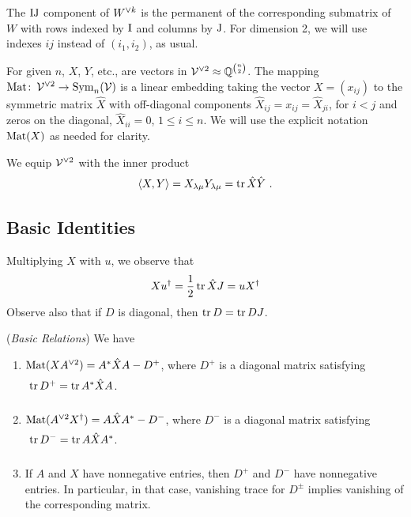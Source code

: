 The ${\rm I}{\rm J}$ component of ${W}^{\vee k}$ is the permanent of the corresponding submatrix of $W$ with
rows indexed by ${\rm I}$ and columns by ${\rm J}$. For dimension 2, we will use indexes $ij$ instead
of $(i_1,i_2)$, as usual.

For given $n$, $X$, $Y$, etc., are vectors in ${{\mathcal V}}^{\vee 2}\approx\mathbb{Q}^{\binom{n}{2}}$.
The mapping \hfb ${\rm Mat}\colon\,{{\mathcal V}}^{\vee 2}\to {\rm Sym}_n({\mathcal V})$ is a linear embedding taking
the vector $X=(x_{ij})$ to the symmetric matrix $\hat X$ with off-diagonal components 
$\hat X_{ij}=x_{ij}=\hat X_{ji}$, for $i<j$ and zeros on the diagonal, $\hat X_{ii}=0$, $1\le i\le n$.
We will use the explicit notation ${\rm Mat}(X)$ as needed for clarity.

We equip ${{\mathcal V}}^{\vee 2}$ with the inner product 
$$
  \avg X,Y.=X_{\lambda\mu} Y_{\lambda\mu}=\tr \hat X\hat Y\ .
$$


\subsection{Basic Identities}
\label{sec:7.1.2}

Multiplying $X$ with $u$, we observe that
%
\begin{equation}\label{eqtrace1}
  X\dg u.=\frac12\,\tr \hat X J=u\dg  X.
\end{equation}
%
Observe also that if $D$ is diagonal, then ${\rm tr}\, D={\rm tr}\, DJ$.

\begin{proposition}\label{propBR}
   	\label{prop:6.6}
(\textsl{Basic Relations}) We have
\begin{enumerate}
\item[{\normalfont 1.}] ${\rm Mat}(X{A}^{\vee 2}) = {A}^*{\hat X}{A}-D^+$, where $D^+$ is a diagonal matrix satisfying $\vstrut\tr D^+=\tr \symm{A}{\hat X}$.

\item[{\normalfont 2.}] $\Mat(\spow{A}{2}\dg  X.) = \sym{A}{\hat X}-D^-$, where $D^-$ is a diagonal matrix satisfying $\vstrut\tr D^-=\tr \sym{A}{\hat X}$.

\item[{\normalfont 3.}] If $A$ and $X$ have nonnegative entries, then $D^+$ and $D^-$ have nonnegative entries. In particular, in that case,
vanishing trace for $D^{\pm}$ implies vanishing of the corresponding matrix.
\end{enumerate}
\end{proposition}

